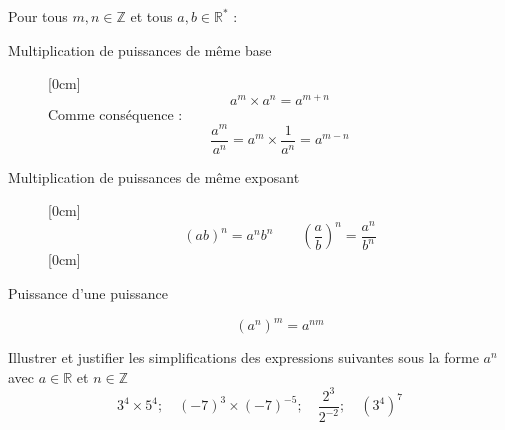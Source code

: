 \begin{theorem}
	Pour tous  $m, n \in\mathbb{Z}$ et tous $a, b\in\mathbb{R}^*$ :
	\begin{description}
		\item[Multiplication de puissances de même base]  
		\[ 
		a^m\times a^n   =a^{m+n} 
		\]
		Comme conséquence :
		\[
		\frac{a^m}{a^n}   =a^m\times \frac{1}{a^n} = a^{m-n}   
		\]
		\item[Multiplication de puissances de même exposant] 
		\[ 
		(ab)^n = a^n b^n \qquad  \left(\frac{a}{b}\right)^n  = \frac{a^n}{b^n}
		\] 
		\item[Puissance d'une puissance]
		\[ 
		(a^n )^m  = a^{nm} 
		\] 
	\end{description}
\end{theorem}

\begin{example} 
	Illustrer et justifier les simplifications des expressions suivantes sous la forme $a^n$ avec $a\in\mathbb{R}$   et $n\in\mathbb{Z}$
	\[
	3^4\times 5^4 ;\quad (-7)^3\times(-7)^{-5};\quad \frac{2^3}{2^{-2}};\quad (3^4)^7
	\]
\end{example}
%	 
